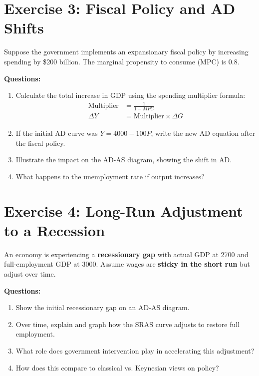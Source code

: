 \documentclass{article}
\begin{document}
\section*{Exercise 3: Fiscal Policy and AD Shifts}
Suppose the government implements an expansionary fiscal policy by increasing spending by \$200 billion. The marginal propensity to consume (MPC) is 0.8.

\textbf{Questions:}
\begin{enumerate}
    \item Calculate the total increase in GDP using the spending multiplier formula:
    \begin{align*}
        \text{Multiplier} &= \frac{1}{1 - MPC} \\
        \Delta Y &= \text{Multiplier} \times \Delta G
    \end{align*}
    \item If the initial AD curve was \( Y = 4000 - 100P \), write the new AD equation after the fiscal policy.
    \item Illustrate the impact on the AD-AS diagram, showing the shift in AD.
    \item What happens to the unemployment rate if output increases?
\end{enumerate}

\section*{Exercise 4: Long-Run Adjustment to a Recession}
An economy is experiencing a \textbf{recessionary gap} with actual GDP at \(2700\) and full-employment GDP at \(3000\). Assume wages are \textbf{sticky in the short run} but adjust over time.

\textbf{Questions:}
\begin{enumerate}
    \item Show the initial recessionary gap on an AD-AS diagram.
    \item Over time, explain and graph how the SRAS curve adjusts to restore full employment.
    \item What role does government intervention play in accelerating this adjustment?
    \item How does this compare to classical vs. Keynesian views on policy?
\end{enumerate}
\end{document}
